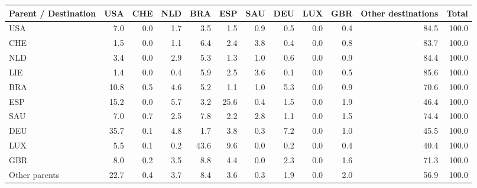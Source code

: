\begin{tabular}{lrrrrrrrrrrr}
\toprule
Parent / Destination & USA & CHE & NLD & BRA & ESP & SAU & DEU & LUX & GBR & Other destinations & Total \\
\midrule
USA & 7.0 & 0.0 & 1.7 & 3.5 & 1.5 & 0.9 & 0.5 & 0.0 & 0.4 & 84.5 & 100.0 \\
CHE & 1.5 & 0.0 & 1.1 & 6.4 & 2.4 & 3.8 & 0.4 & 0.0 & 0.8 & 83.7 & 100.0 \\
NLD & 3.4 & 0.0 & 2.9 & 5.3 & 1.3 & 1.0 & 0.6 & 0.0 & 0.9 & 84.4 & 100.0 \\
LIE & 1.4 & 0.0 & 0.4 & 5.9 & 2.5 & 3.6 & 0.1 & 0.0 & 0.5 & 85.6 & 100.0 \\
BRA & 10.8 & 0.5 & 4.6 & 5.2 & 1.1 & 1.0 & 5.3 & 0.0 & 0.9 & 70.6 & 100.0 \\
ESP & 15.2 & 0.0 & 5.7 & 3.2 & 25.6 & 0.4 & 1.5 & 0.0 & 1.9 & 46.4 & 100.0 \\
SAU & 7.0 & 0.7 & 2.5 & 7.8 & 2.2 & 2.8 & 1.1 & 0.0 & 1.5 & 74.4 & 100.0 \\
DEU & 35.7 & 0.1 & 4.8 & 1.7 & 3.8 & 0.3 & 7.2 & 0.0 & 1.0 & 45.5 & 100.0 \\
LUX & 5.5 & 0.1 & 0.2 & 43.6 & 9.6 & 0.0 & 0.2 & 0.0 & 0.4 & 40.4 & 100.0 \\
GBR & 8.0 & 0.2 & 3.5 & 8.8 & 4.4 & 0.0 & 2.3 & 0.0 & 1.6 & 71.3 & 100.0 \\
Other parents & 22.7 & 0.4 & 3.7 & 8.4 & 3.6 & 0.3 & 1.9 & 0.0 & 2.0 & 56.9 & 100.0 \\
\bottomrule
\end{tabular}
